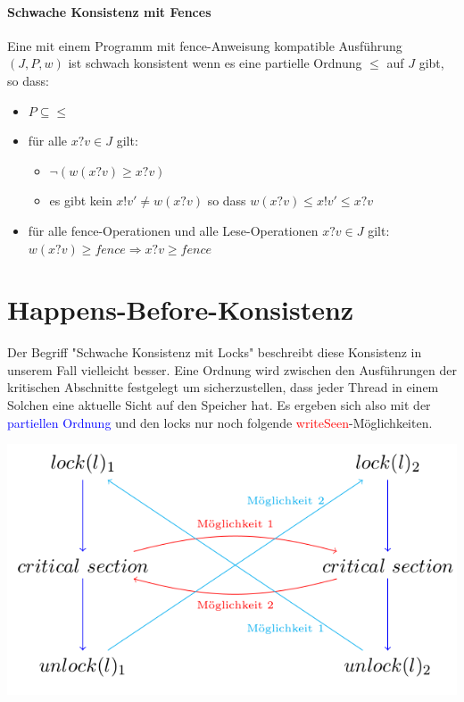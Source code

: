 \documentclass[a4paper,10pt, oneside]{book}
\begin{document}
\paragraph{Schwache Konsistenz mit Fences}
Eine mit einem Programm mit fence-Anweisung kompatible Ausführung $(J,P,w)$ ist schwach konsistent wenn es eine partielle Ordnung $\leq$ auf $J$ gibt, so dass:
\begin{itemize}
	\item $P \subseteq \leq$
	\item für alle $x?v \in J$ gilt:
	\begin{itemize}
		\item $\neg(w(x?v) \geq x?v)$
		\item es gibt kein $x!v' \not= w(x?v)$ so dass $w(x?v) \leq x!v' \leq x?v$
	\end{itemize}
	\item für alle fence-Operationen und alle Lese-Operationen $x?v \in J$ gilt: $w(x?v) \geq fence \Rightarrow x?v \geq fence$
\end{itemize}

\section{Happens-Before-Konsistenz}
Der Begriff "Schwache Konsistenz mit Locks" beschreibt diese Konsistenz in unserem Fall vielleicht besser. Eine Ordnung wird zwischen den Ausführungen der kritischen Abschnitte festgelegt um sicherzustellen, dass jeder Thread in einem Solchen eine aktuelle Sicht auf den Speicher hat. Es ergeben sich also mit der \textcolor{blue}{partiellen Ordnung} und den locks nur noch folgende \textcolor{red}{writeSeen}-Möglichkeiten.

\begin{center}
\includegraphics[scale=0.4]{happensBeforeDia}
\end{center}
\end{document}
